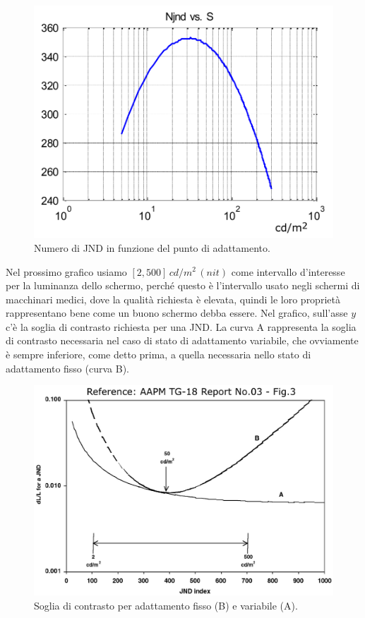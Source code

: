 \documentclass[a4paper,11pt]{article}
\begin{document}
\newpage
\renewcommand{\thefigure}{2.10}
\begin{figure}[!h]
  \centering
    \includegraphics[scale=0.5]{images/2/jnd_fixed.png}
    \caption{Numero di JND in funzione del punto di adattamento.}
\end{figure}


Nel prossimo grafico usiamo $[2, 500] \,cd/m^2\, (nit)$ come intervallo d'interesse per la luminanza dello schermo, perché questo
è l'intervallo usato negli schermi di macchinari medici, dove la qualità richiesta è elevata, quindi le loro proprietà rappresentano bene come un buono schermo debba essere.
Nel grafico, sull'asse $y$ c'è la soglia di contrasto richiesta per una JND.
La curva A rappresenta la soglia di contrasto necessaria nel caso di stato di adattamento variabile, che ovviamente è sempre inferiore,
come detto prima, a quella necessaria nello stato di adattamento fisso (curva B).

\newpage
\renewcommand{\thefigure}{2.11}
\begin{figure}[!h]
  \centering
    \includegraphics[scale=0.38]{images/2/fixed_vs_varying.png}
    \caption{Soglia di contrasto per adattamento fisso (B) e variabile (A).}
\end{figure}
\end{document}
